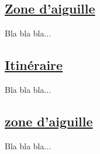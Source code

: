 \subsection{\underline{Zone d'aiguille}}
\label{sec:aig}

Bla bla bla...


\subsection{\underline{Itinéraire}}
\label{sec:iti}

Bla bla bla...

\subsection{\underline{zone d'aiguille}}
\label{sec:aig}

Bla bla bla...



\newpage





